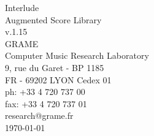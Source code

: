 \documentclass[a4paper]{book}
\begin{document}
\begin{titlepage}
\vspace*{7cm}
\begin{center}
{\huge Interlude\\ Augmented Score Library \\[1ex]\large v.1.15}\\
\vspace*{2cm}
{\large GRAME \\ Computer Music Research Laboratory}\\
\vspace*{0.5cm}
{\small 9, rue du Garet - BP 1185}\\
{\small FR - 69202 LYON Cedex 01}\\
\vspace*{0.5cm}
{\small ph:  +33 4 720 737 00}\\
{\small fax: +33 4 720 737 01}\\
\vspace*{0.5cm}
{\small research@grame.fr}\\
\vspace*{0.5cm}
\today 
\end{center}
\end{titlepage}
\clearemptydoublepage
{}
\tableofcontents
\clearemptydoublepage
{}
\end{document}
